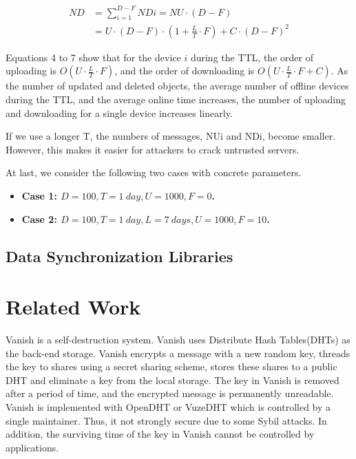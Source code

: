 \documentclass[twocolumn,10pt]{article}
\begin{document}
\begin{equation}
\begin{aligned}
ND &= \sum_{i=1}^{D - F} NDi = NU \cdot (D - F) \\&= U \cdot (D - F) \cdot (1 + \frac{L}{T} \cdot F) + C \cdot (D - F) ^{2}
\end{aligned}
\end{equation}

Equations 4 to 7 show that for the device $i$ during the TTL, the order of uploading is $O(U \cdot \frac{L}{T} \cdot F)$, and the order of downloading is $O(U \cdot \frac{L}{T} \cdot F + C)$.
As the number of updated and deleted objects, the average number of offline devices during the TTL, and the average online time increases, the number of uploading and downloading for a single device increases linearly.

If we use a longer T, the numbers of messages, NUi and NDi, become smaller.
However, this makes it easier for attackers to crack untrusted servers.

At last, we consider the following two cases with concrete parameters.

 \begin{itemize}
 	\setlength{\itemsep}{1pt}
 	\setlength{\parskip}{0pt}
 	\setlength{\parsep}{0pt}
 	\item \textbf{Case 1: $D = 100, T = 1 \ day, U = 1000, F = 0$.}

 	\item \textbf{Case 2: $D = 100, T = 1 \ day, L = 7 \  days, U = 1000, F = 10$.} 

\end{itemize}

\subsection{Data Synchronization Libraries}

\section{Related Work}

Vanish is a self-destruction system\cite{geambasu2009vanish}. 
Vanish uses Distribute Hash Tables(DHTs) as the back-end storage.
Vanish encrypts a message with a new random key, threads the key to shares using a secret sharing scheme, stores these shares to a public DHT and eliminate a key from the local storage.
The key in Vanish is removed after a period of time, and the encrypted message is permanently unreadable.
Vanish is implemented with OpenDHT\cite{rhea2005opendht} or VuzeDHT\cite{vuzedht} which is controlled by a single maintainer. 
Thus, it not strongly secure due to some Sybil attacks\cite{wolchok2010defeating}. 
In addition, the surviving time of the key in Vanish cannot be controlled by applications. 
\end{document}
